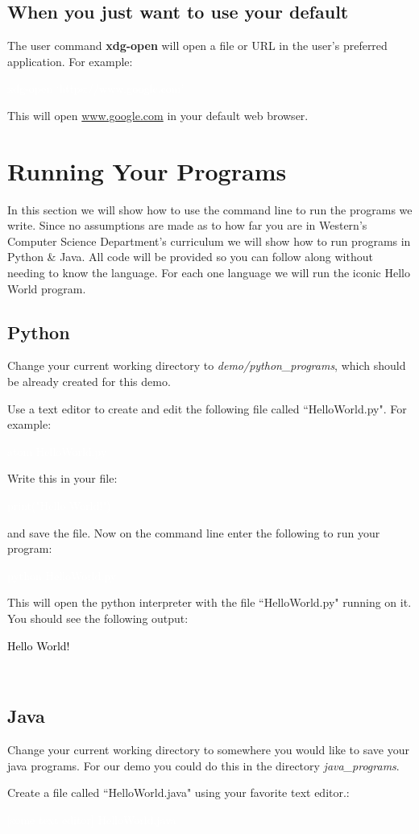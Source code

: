 \documentclass[oneside]{book}
\newcommand{\commandline}[1]{\begin{center} \colorbox{Dark}{\textcolor{white}{#1}} \end{center}}
\newcommand{\exampleout}[1]{\begin{center} \colorbox{Light}{\textcolor{black}{#1}} \end{center}}
\begin{document}
\subsection{When you just want to use your default}
The user command \textbf{xdg-open} will open a file or URL in the user's preferred application. For example:
\commandline{xdg-open `https://www.google.com'}

This will open \url{www.google.com} in your default web browser.

\section{Running Your Programs}
In this section we will show how to use the command line to run the programs we write. Since no assumptions are made as to how far you are in Western's Computer Science Department's curriculum we will show how to run programs in Python \& Java. All code will be provided so you can follow along without needing to know the language. For each one language we will run the iconic Hello World program.
\subsection{Python}
Change your current working directory to \textit{demo/python\_programs}, which should be already created for this demo.

Use a text editor to create and edit the following file called ``HelloWorld.py". For example:
\commandline{atom HelloWorld.py}

Write this in your file:

\commandline{print("Hello World!")}
 and save the file. Now on the command line enter the following to run your program:
\commandline{python HelloWorld.py}
This will open the python interpreter with the file ``HelloWorld.py" running on it. You should see the following output:
\exampleout{Hello World!}\\

\subsection{Java}
Change your current working directory to somewhere you would like to save your java programs. For our demo you could do this in the directory \textit{java\_programs}.

Create a file called ``HelloWorld.java" using your favorite text editor.:

\commandline{[some text editor] HelloWorld.java}
\end{document}
